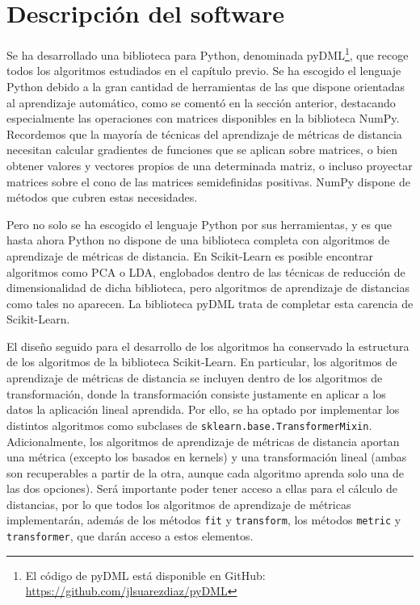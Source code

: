 \section{Descripción del software}

Se ha desarrollado una biblioteca para Python, denominada pyDML\footnote{El código de pyDML está disponible en GitHub: \url{https://github.com/jlsuarezdiaz/pyDML}}, que recoge todos los algoritmos estudiados en el capítulo previo. Se ha escogido el lenguaje Python debido a la gran cantidad de herramientas de las que dispone orientadas al aprendizaje automático, como se comentó en la sección anterior, destacando especialmente las operaciones con matrices disponibles en la biblioteca NumPy. Recordemos que la mayoría de técnicas del aprendizaje de métricas de distancia necesitan calcular gradientes de funciones que se aplican sobre matrices, o bien obtener valores y vectores propios de una determinada matriz, o incluso proyectar matrices sobre el cono de las matrices semidefinidas positivas. NumPy dispone de métodos que cubren estas necesidades.

Pero no solo se ha escogido el lenguaje Python por sus herramientas, y es que hasta ahora Python no dispone de una biblioteca completa con algoritmos de aprendizaje de métricas de distancia. En Scikit-Learn es posible encontrar algoritmos como PCA o LDA, englobados dentro de las técnicas de reducción de dimensionalidad de dicha biblioteca, pero algoritmos de aprendizaje de distancias como tales no aparecen. La biblioteca pyDML trata de completar esta carencia de Scikit-Learn.

El diseño seguido para el desarrollo de los algoritmos ha conservado la estructura de los algoritmos de la biblioteca Scikit-Learn. En particular, los algoritmos de aprendizaje de métricas de distancia se incluyen dentro de los algoritmos de transformación, donde la transformación consiste justamente en aplicar a los datos la aplicación lineal aprendida. Por ello, se ha optado por implementar los distintos algoritmos como subclases de \texttt{sklearn.base.TransformerMixin}. Adicionalmente, los algoritmos de aprendizaje de métricas de distancia aportan una métrica (excepto los basados en kernels) y una transformación lineal (ambas son recuperables a partir de la otra, aunque cada algoritmo aprenda solo una de las dos opciones). Será importante poder tener acceso a ellas para el cálculo de distancias, por lo que todos los algoritmos de aprendizaje de métricas implementarán, además de los métodos \texttt{fit} y \texttt{transform}, los métodos \texttt{metric} y \texttt{transformer}, que darán acceso a estos elementos.

